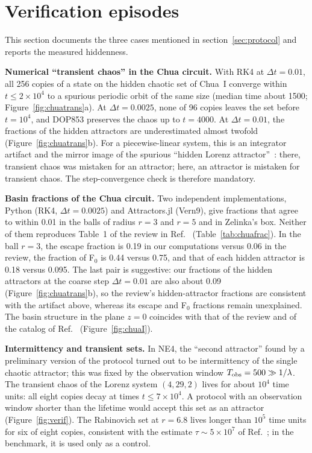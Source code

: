 \section{Verification episodes}\label{app:verification}

This section documents the three cases mentioned in section~\ref{sec:protocol} and reports the measured hiddenness.

\textbf{Numerical ``transient chaos'' in the Chua circuit.} With RK4 at $\Delta t=0.01$, all 256 copies of a state on the hidden chaotic set of Chua~I converge within $t\le2\times10^4$ to a spurious periodic orbit of the same size (median time about 1500; Figure~\ref{fig:chuatrans}a). At $\Delta t=0.0025$, none of 96 copies leaves the set before $t=10^4$, and DOP853 preserves the chaos up to $t=4000$. At $\Delta t=0.01$, the fractions of the hidden attractors are underestimated almost twofold (Figure~\ref{fig:chuatrans}b). For a piecewise-linear system, this is an integrator artifact and the mirror image of the spurious ``hidden Lorenz attractor''~\cite{Munmuangsaen2018,SprottMunmuangsaen2018Comment}: there, transient chaos was mistaken for an attractor; here, an attractor is mistaken for transient chaos. The step-convergence check is therefore mandatory.

\textbf{Basin fractions of the Chua circuit.} Two independent implementations, Python (RK4, $\Delta t=0.0025$) and Attractors.jl (Vern9), give fractions that agree to within 0.01 in the balls of radius $r=3$ and $r=5$ and in Zelinka's box. Neither of them reproduces Table~1 of the review in Ref.~\cite{GuanXie2025} (Table~\ref{tab:chuafrac}). In the ball $r=3$, the escape fraction is 0.19 in our computations versus 0.06 in the review, the fraction of F$_0$ is 0.44 versus 0.75, and that of each hidden attractor is 0.18 versus 0.095. The last pair is suggestive: our fractions of the hidden attractors at the coarse step $\Delta t=0.01$ are also about 0.09 (Figure~\ref{fig:chuatrans}b), so the review's hidden-attractor fractions are consistent with the artifact above, whereas its escape and F$_0$ fractions remain unexplained. The basin structure in the plane $z=0$ coincides with that of the review and of the catalog of Ref.~\cite{Wagemakers2025Zoo} (Figure~\ref{fig:chuaI}).

\textbf{Intermittency and transient sets.} In NE4, the ``second attractor'' found by a preliminary version of the protocol turned out to be intermittency of the single chaotic attractor; this was fixed by the observation window $T_{\rm obs}=500\gg1/\lambda$. The transient chaos of the Lorenz system $(4,29,2)$ lives for about $10^4$ time units: all eight copies decay at times $t\le7\times10^4$. A protocol with an observation window shorter than the lifetime would accept this set as an attractor (Figure~\ref{fig:verif}). The Rabinovich set at $r=6.8$ lives longer than $10^5$ time units for six of eight copies, consistent with the estimate $\tau\sim5\times10^7$ of Ref.~\cite{SprottMunmuangsaen2018Comment}; in the benchmark, it is used only as a control.

